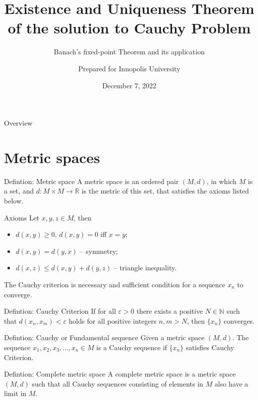 \documentclass[10pt]{beamer}
\title[Existence and Uniqueness Theorem of the solution to Cauchy Problem]
{Existence and Uniqueness Theorem of the solution to Cauchy Problem}
\subtitle
{Banach's fixed-point Theorem and its application}
\date{December 7, 2022}
\author{Prepared for Innopolis University}
\begin{document}
\begin{frame}
  \titlepage
\end{frame}

\begin{frame}{Overview}
  \tableofcontents
\end{frame}

\section{Metric spaces}
\begin{frame}
  \begin{block}{Defintion: Metric space}
    A metric space is an ordered pair \((M, d)\), in which \(M\) is a set,
    and \(d:M \times M \rightarrow \mathbb{R}\) is the metric of this set, that satisfies
    the axioms listed below.
  \end{block}

  \begin{alertblock}{Axioms}
    Let \(x, y, z \in M\), then
    \begin{itemize}
      \item \(d(x, y) \ge 0\), \(d(x, y) = 0\) iff \(x = y\);
      \item \(d(x, y) = d(y, x)\) -- symmetry;
      \item \(d(x, z) \le d(x, y) + d(y, z)\) -- triangle inequality.
    \end{itemize}
  \end{alertblock}
\end{frame}

\begin{frame}
  The Cauchy criterion is necessary and sufficient condition for a sequence \(x_n\) to converge.
  \begin{block}{Defintion: Cauchy Criterion}
    If for all \(\varepsilon > 0\) there exists a positive \(N \in \mathbb{N}\) such that
    \(d(x_n, x_m) < \varepsilon\) holds for all positive integers \(n, m > N\), then \(\{x_n\}\) converges.
  \end{block}

  \begin{block}{Defintion: Cauchy or Fundamental sequence}
    Given a metric space \((M, d)\). The sequence \(x_1, x_2, x_3, ..., x_n \in M\) is a Cauchy sequence if
    \(\{x_n\}\) satisfies Cauchy Criterion.
  \end{block}

  \begin{block}{Defintion: Complete metric space}
    A complete metric space is a metric space \((M, d)\) such that
    all Cauchy sequences consisting of elements in \(M\) also have a limit in \(M\).
  \end{block}
\end{frame}
\end{document}
